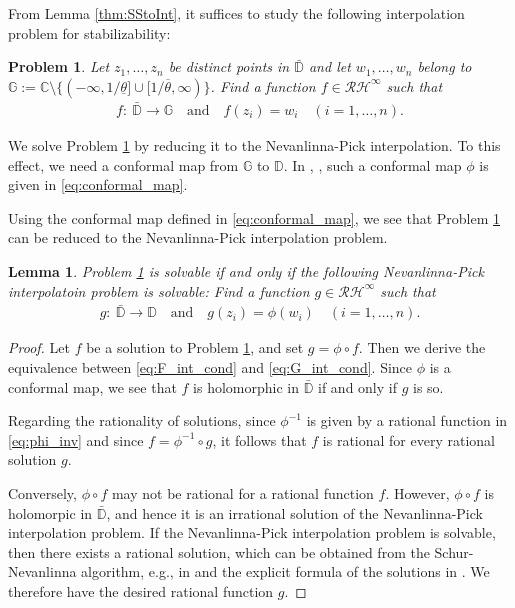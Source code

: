 \documentclass[letterpaper, 12pt, draftcls, onecolumn]{ieeeconf}
\newtheorem{problem}[theorem]{Problem}
\newtheorem{lemma}[theorem]{Lemma}
\begin{document}
From Lemma \ref{thm:SStoInt},
it suffices to study the following interpolation problem
for stabilizability:
\begin{problem}
	\label{prob:interpolation}
	{\it
		Let $z_1,\dots, z_n$ be distinct points in $\bar{\mathbb{D}}$ and
		let $w_1,\dots,w_n$ belong to
		$\mathbb{G} := \mathbb{C} \setminus
		\{(-\infty, 1/\underline \theta] \cup [1/\overline \theta,\infty) \}$.
		Find a function $f \in \mathcal{RH}^{\infty}$ such that
		\begin{align} \label{eq:F_int_cond}
		f:~\bar{\mathbb{D}} \to \mathbb{G} \text{~~~and~~~}
f(z_i) = w_i \quad (i=1,\dots,n).
		\end{align} 
}
\end{problem}

We solve Problem \ref{prob:interpolation}
by reducing it to the Nevanlinna-Pick interpolation.
To this effect,
we need a conformal map from 
$
\mathbb{G}
$
to $\mathbb{D}$.
In \cite{Olbrot1994}, 
\cite[Section 4.1]{foias1996},
such a conformal map $\phi$ is given in
\eqref{eq:conformal_map}.


Using
the conformal map defined in \eqref{eq:conformal_map},
we see that
Problem \ref{prob:interpolation} can be reduced to
the Nevanlinna-Pick interpolation problem.
\begin{lemma}
	\label{thm:ReductionNPInt}
	{\it
		Problem \ref{prob:interpolation} is solvable if and only if
		the following Nevanlinna-Pick interpolatoin problem is solvable:
		Find a function $g \in \mathcal{RH}^{\infty}$ 
		such that
		\begin{align} \label{eq:G_int_cond}
		g:~\bar{\mathbb{D}} \to \mathbb{D} \text{~~~and~~~}
g(z_i) = \phi(w_i) \quad (i=1,\dots,n).
		\end{align}
	}
\end{lemma}

\begin{proof}
Let $f$ be a solution to Problem \ref{prob:interpolation}, and
set $g=\phi \circ f$. Then we derive
the equivalence between \eqref{eq:F_int_cond} and \eqref{eq:G_int_cond}.
Since $\phi$ is a conformal map,
we see that $f$ is holomorphic in $\bar {\mathbb{D}}$ if and only if
$g$ is so.

Regarding the rationality of solutions, 
since $\phi^{-1}$ is given by
a rational function in \eqref{eq:phi_inv}
and since $f = \phi^{-1} \circ g$, 
it follows that $f$ is rational for every rational solution $g$.

Conversely, $\phi \circ f$ may not be rational for a
rational function $f$. 
However, $\phi \circ f$ is holomorpic in $\bar {\mathbb{D}}$, 
and hence it is an irrational
solution of
the Nevanlinna-Pick interpolation problem.
If the Nevanlinna-Pick interpolation problem is solvable, 
then there exists a rational solution,
which can be obtained from the Schur-Nevanlinna algorithm, e.g., in
\cite{luxemburg2010, wakaiki2012}
and the explicit formula of the solutions in 
\cite[Sec. 2.11]{foias1996}.
We therefore have the desired rational function $g$.
\end{proof}
\end{document}
